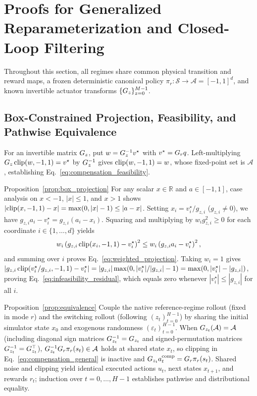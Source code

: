 \section{Proofs for Generalized Reparameterization and Closed-Loop Filtering}
\label{app:proofs}

Throughout this section, all regimes share common physical transition and reward maps, a frozen deterministic canonical policy $\pi_r:\mathcal{S}\to\mathcal{A}=[-1,1]^d$, and known invertible actuator transforms $\{G_z\}_{z=0}^{M-1}$.

\subsection{Box-Constrained Projection, Feasibility, and Pathwise Equivalence}

For an invertible matrix $G_z$, put $w=G_z^{-1}v^\star$ with $v^\star=G_r q$. Left-multiplying $G_z\operatorname{clip}(w,-1,1)=v^\star$ by $G_z^{-1}$ gives $\operatorname{clip}(w,-1,1)=w$, whose fixed-point set is $\mathcal{A}$, establishing Eq.~\eqref{eq:compensation_feasibility}.

\begin{proofof}{Proposition~\ref{prop:box_projection}}
For any scalar $x\in\mathbb{R}$ and $a\in[-1,1]$, case analysis on $x<-1$, $|x|\le 1$, and $x>1$ shows $|{\operatorname{clip}(x,-1,1)-x}|=\max(0,|x|-1)\le |a-x|$. Setting $x_i=v_i^\star/g_{z,i}$ ($g_{z,i}\ne 0$), we have $g_{z,i}a_i-v_i^\star=g_{z,i}(a_i-x_i)$. Squaring and multiplying by $w_i g_{z,i}^2\ge 0$ for each coordinate $i\in\{1,\ldots,d\}$ yields
\begin{equation}
 w_i\left(g_{z,i}\operatorname{clip}(x_i,-1,1)-v_i^\star\right)^2
 \le w_i\left(g_{z,i}a_i-v_i^\star\right)^2,
\end{equation}
and summing over $i$ proves Eq.~\eqref{eq:weighted_projection}. Taking $w_i=1$ gives $|g_{z,i}\operatorname{clip}(v_i^\star/g_{z,i},-1,1)-v_i^\star|=|g_{z,i}|\max(0,|v_i^\star|/|g_{z,i}|-1)=\max(0,|v_i^\star|-|g_{z,i}|)$, proving Eq.~\eqref{eq:infeasibility_residual}, which equals zero whenever $|v_i^\star|\le |g_{z,i}|$ for all $i$.
\end{proofof}

\begin{proofof}{Proposition~\ref{prop:equivalence}}
Couple the native reference-regime rollout (fixed in mode $r$) and the switching rollout (following $(z_t)_{t=0}^{H-1}$) by sharing the initial simulator state $x_0$ and exogenous randomness $(\varepsilon_t)_{t=0}^{H-1}$. When $G_{z_t}(\mathcal{A})=\mathcal{A}$ (including diagonal sign matrices $G_{z_t}^{-1}=G_{z_t}$ and signed-permutation matrices $G_{z_t}^{-1}=G_{z_t}^\top$), $G_{z_t}^{-1}G_r\pi_r(s_t)\in\mathcal{A}$ holds at shared state $x_t$, so clipping in Eq.~\eqref{eq:compensation_general} is inactive and $G_{z_t}a_t^{\mathrm{comp}}=G_r\pi_r(s_t)$. Shared noise and clipping yield identical executed actions $u_t$, next states $x_{t+1}$, and rewards $r_t$; induction over $t=0,\ldots,H-1$ establishes pathwise and distributional equality.
\end{proofof}

